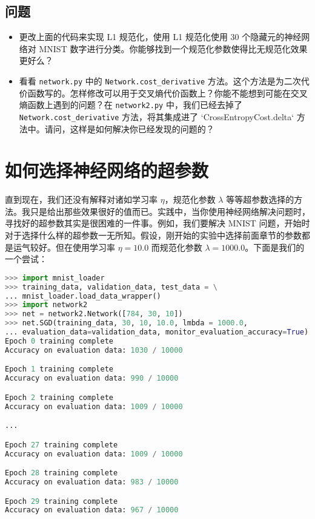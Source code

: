 \subsection*{问题}

\begin{itemize}
\item 更改上面的代码来实现 L1 规范化，使用 L1 规范化使用 $30$ 个隐藏元的神经网络对 MNIST 数字进行分类。你能够找到一个规范化参数使得比无规范化效果更好么？
\item 看看 \lstinline!network.py! 中的 \lstinline!Network.cost_derivative! 方法。这个方法是为二次代价函数写的。怎样修改可以用于交叉熵代价函数上？你能不能想到可能在交叉熵函数上遇到的问题？在 \lstinline!network2.py! 中，我们已经去掉了 \lstinline!Network.cost_derivative! 方法，将其集成进了 `CrossEntropyCost.delta` 方法中。请问，这样是如何解决你已经发现的问题的？
\end{itemize}

\section{如何选择神经网络的超参数}
\label{sec:how_to_choose_a_neural_network's_hyper-parameters}

直到现在，我们还没有解释对诸如学习率 $\eta$，规范化参数 $\lambda$ 等等超参数选择的方法。我只是给出那些效果很好的值而已。实践中，当你使用神经网络解决问题时，寻找好的超参数其实是很困难的一件事。例如，我们要解决 MNIST 问题，开始时对于选择什么样的超参数一无所知。假设，刚开始的实验中选择前面章节的参数都是运气较好。但在使用学习率 $\eta=10.0$ 而规范化参数 $\lambda=1000.0$。下面是我们的一个尝试：

\begin{lstlisting}[language=Python]
>>> import mnist_loader
>>> training_data, validation_data, test_data = \
... mnist_loader.load_data_wrapper()
>>> import network2
>>> net = network2.Network([784, 30, 10])
>>> net.SGD(training_data, 30, 10, 10.0, lmbda = 1000.0,
... evaluation_data=validation_data, monitor_evaluation_accuracy=True)
Epoch 0 training complete
Accuracy on evaluation data: 1030 / 10000

Epoch 1 training complete
Accuracy on evaluation data: 990 / 10000

Epoch 2 training complete
Accuracy on evaluation data: 1009 / 10000

...

Epoch 27 training complete
Accuracy on evaluation data: 1009 / 10000

Epoch 28 training complete
Accuracy on evaluation data: 983 / 10000

Epoch 29 training complete
Accuracy on evaluation data: 967 / 10000
\end{lstlisting}

